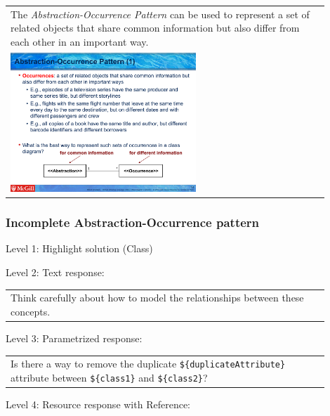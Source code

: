 \begin{tabular}{|p{0.9\linewidth}}
The \textit{Abstraction-Occurrence Pattern} can be used to 
represent a set of related objects that share common information but also differ
from each other in an important way.

\\
\includegraphics[width=0.6\textwidth]{images/abstraction_occurrence.png}
\end{tabular} \medskip


\subsubsection{Incomplete Abstraction-Occurrence pattern}

\noindent Level 1: Highlight solution (Class) \medskip

\noindent Level 2: Text response: \medskip

\begin{tabular}{|p{0.9\linewidth}}
Think carefully about how to model the relationships between these concepts.
\end{tabular} \medskip

\noindent Level 3: Parametrized response: \medskip

\begin{tabular}{|p{0.9\linewidth}}
Is there a way to remove the duplicate \verb|${duplicateAttribute}| attribute between \verb|${class1}| and \verb|${class2}|?
\end{tabular} \medskip

\noindent Level 4: Resource response with Reference: \medskip

